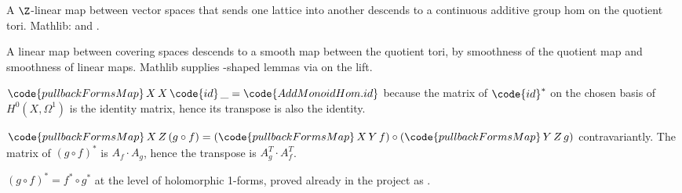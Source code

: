 \begin{lemma}
\label{lem:pdp-r7}
A $\Z$-linear map between vector spaces that sends one lattice into
another descends to a continuous additive group hom on the quotient
tori.  Mathlib:  and
.
\leanok\mathlibok
\end{lemma}

\begin{lemma}
\label{lem:pdp-r8}
A linear map between covering spaces descends to a smooth map between
the quotient tori, by smoothness of the quotient map and smoothness of
linear maps. Mathlib supplies
-shaped lemmas via
 on the lift.
\leanok
\end{lemma}

\begin{lemma}
\label{lem:pdp-r9}
$\code{pullbackFormsMap}\,X\,X\,\code{id}\,\_=\code{AddMonoidHom.id}$
because the matrix of $\code{id}^{*}$ on the chosen basis of
$H^{0}(X,\Omega^{1})$ is the identity matrix, hence its transpose is
also the identity.
\leanok
\end{lemma}

\begin{lemma}
\label{lem:pdp-r10}
$\code{pullbackFormsMap}\,X\,Z\,(g\circ f)
=(\code{pullbackFormsMap}\,X\,Y\,f)\circ(\code{pullbackFormsMap}\,Y\,Z\,g)$
contravariantly. The matrix of $(g\circ f)^{*}$ is $A_{f}\cdot A_{g}$,
hence the transpose is $A_{g}^{T}\cdot A_{f}^{T}$.
\leanok
\end{lemma}

\begin{lemma}
\label{lem:pdp-r11}
$(g\circ f)^{*}=f^{*}\circ g^{*}$ at the level of holomorphic 1-forms,
proved already in the project as
.
\leanok
\end{lemma}

